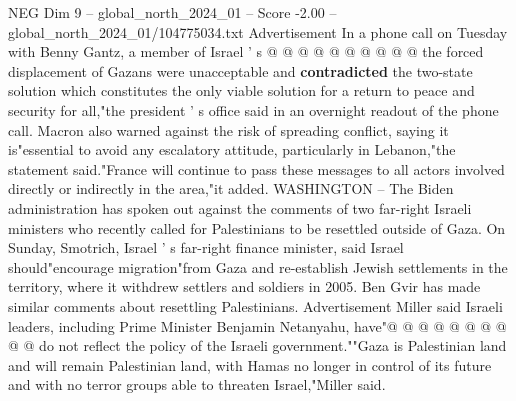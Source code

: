 \begin{textsample}{NEG Dim 9 – global\_north\_2024\_01 – Score -2.00 – global\_north\_2024\_01/104775034.txt}
Advertisement In a phone call on Tuesday with Benny Gantz, a member of Israel ' s @ @ @ @ @ @ @ @ @ @ the forced displacement of Gazans were unacceptable and \textbf{contradicted} the two-state solution which constitutes the only viable solution for a return to peace and security for all,"the president ' s office said in an overnight readout of the phone call.
Macron also warned against the risk of spreading conflict, saying it is"essential to avoid any escalatory attitude, particularly in Lebanon,"the statement said."France will continue to pass these messages to all actors involved directly or indirectly in the area,"it added.
WASHINGTON -- The Biden administration has spoken out against the comments of two far-right Israeli ministers who recently called for Palestinians to be resettled outside of Gaza.
On Sunday, Smotrich, Israel ' s far-right finance minister, said Israel should"encourage migration"from Gaza and re-establish Jewish settlements in the territory, where it withdrew settlers and soldiers in 2005.
Ben Gvir has made similar comments about resettling Palestinians.
Advertisement Miller said Israeli leaders, including Prime Minister Benjamin Netanyahu, have"@ @ @ @ @ @ @ @ @ @ do not reflect the policy of the Israeli government.""Gaza is Palestinian land and will remain Palestinian land, with Hamas no longer in control of its future and with no terror groups able to threaten Israel,"Miller said.

\end{textsample}
